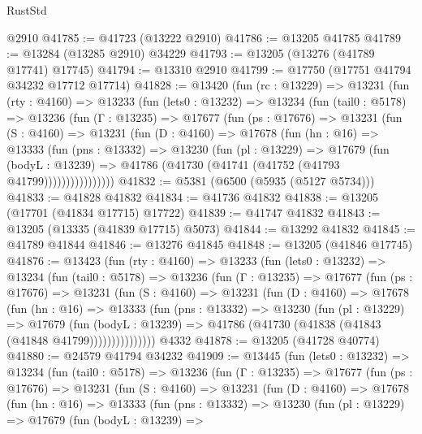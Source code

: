 \begin{lexlean}{RustStd}
\begin{coremodule}
    @2910
@41785 := @41723 (@13222 @2910)
@41786 := @13205 @41785
@41789 := @13284 (@13285 @2910) @34229
@41793 := @13205 (@13276 (@41789 @17741) @17745)
@41794 := @13310 @2910
@41799 := @17750 (@17751 @41794 @34232 @17712 @17714)
@41828 := @13420
    (fun (rc : @13229) =>
    @13231
      (fun (rty : @4160) =>
      @13233
        (fun (lets0 : @13232) =>
        @13234
          (fun (tail0 : @5178) =>
          @13236
            (fun (Γ : @13235) =>
            @17677
              (fun (ps : @17676) =>
              @13231
                (fun (S : @4160) =>
                @13231
                  (fun (D : @4160) =>
                  @17678
                    (fun (hn : @16) =>
                    @13333
                      (fun (pns : @13332) =>
                      @13230
                        (fun (pl : @13229) =>
                        @17679
                          (fun (bodyL : @13239) =>
                          @41786 (@41730 (@41741 (@41752 (@41793 @41799))))))))))))))))
@41832 := @5381 (@6500 (@5935 (@5127 @5734)))
@41833 := @41828 @41832
@41834 := @41736 @41832
@41838 := @13205 (@17701 (@41834 @17715) @17722)
@41839 := @41747 @41832
@41843 := @13205 (@13335 (@41839 @17715) @5073)
@41844 := @13292 @41832
@41845 := @41789 @41844
@41846 := @13276 @41845
@41848 := @13205 (@41846 @17745)
@41876 := @13423
    (fun (rty : @4160) =>
    @13233
      (fun (lets0 : @13232) =>
      @13234
        (fun (tail0 : @5178) =>
        @13236
          (fun (Γ : @13235) =>
          @17677
            (fun (ps : @17676) =>
            @13231
              (fun (S : @4160) =>
              @13231
                (fun (D : @4160) =>
                @17678
                  (fun (hn : @16) =>
                  @13333
                    (fun (pns : @13332) =>
                    @13230
                      (fun (pl : @13229) =>
                      @17679
                        (fun (bodyL : @13239) =>
                        @41786 (@41730 (@41838 (@41843 (@41848 @41799)))))))))))))))
    @4332
@41878 := @13205 (@41728 @40774)
@41880 := @24579 @41794 @34232
@41909 := @13445
    (fun (lets0 : @13232) =>
    @13234
      (fun (tail0 : @5178) =>
      @13236
        (fun (Γ : @13235) =>
        @17677
          (fun (ps : @17676) =>
          @13231
            (fun (S : @4160) =>
            @13231
              (fun (D : @4160) =>
              @17678
                (fun (hn : @16) =>
                @13333
                  (fun (pns : @13332) =>
                  @13230
                    (fun (pl : @13229) =>
                    @17679
                      (fun (bodyL : @13239) =>

\end{coremodule}
\end{lexlean}
